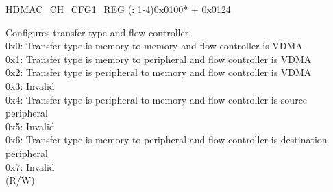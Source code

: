 \begin{register}{H}{DMAC\_CH\_CFG1\_REG (: 1-4)}{0x0100* + 0x0124}\label{regdesc:DMACCHNCFG1REG}
%
%
%
%
%
%
%
%
%
%
%
%
\regnewline%
\begin{regdesc}\begin{reglist}
\label{fielddesc:DMACCHNTTFC}\item [DMAC\_CH\regindex{n}\_TT\_FC] Configures transfer type and flow controller. \\
0x0: Transfer type is memory to memory and flow controller is VDMA \\
0x1: Transfer type is memory to peripheral and flow controller is VDMA \\
0x2: Transfer type is peripheral to memory and flow controller is VDMA \\
0x3: Invalid \\
0x4: Transfer type is peripheral to memory and flow controller is source peripheral \\
0x5: Invalid\\
0x6: Transfer type is memory to peripheral and flow controller is destination peripheral \\
0x7: Invalid\\
(R/W)


\end{reglist}
\end{regdesc}
\end{register}
